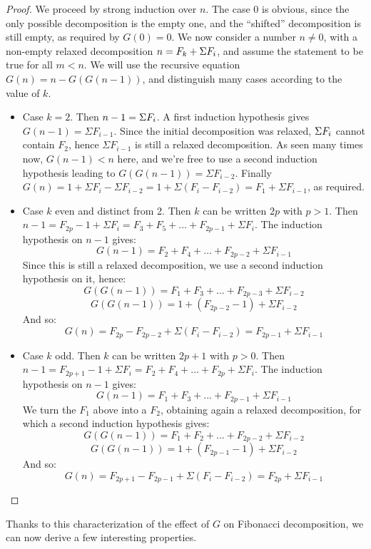 \documentclass[a4paper,11pt]{article}
\begin{document}
\begin{proof}
We proceed by strong induction over $n$. The case $0$ is obvious,
since the only possible decomposition is the empty one, and the
``shifted'' decomposition is still empty, as required by $G(0)=0$.
We now consider a number $n\neq 0$, with a non-empty relaxed decomposition
$n = F_k+\Sigma F_i$, and assume the statement to be true for all $m<n$.
We will use the recursive equation $G(n)=n-G(G(n-1))$, and distinguish
many cases according to the value of $k$.
\begin{itemize}
\item Case $k=2$. Then $n-1 = \Sigma F_i$. A first induction
  hypothesis gives $G(n-1) = \Sigma F_{i-1}$. Since the initial
  decomposition was relaxed, $\Sigma F_i$ cannot contain $F_2$,
  hence $\Sigma F_{i-1}$ is still a relaxed decomposition. As seen
  many times now, $G(n-1)<n$ here, and we're free to use a second
  induction hypothesis leading to $G(G(n-1)) = \Sigma F_{i-2}$.
  Finally $G(n) = 1+\Sigma F_i - \Sigma F_{i-2} = 1 + \Sigma (F_i-F_{i-2})
   = F_1 + \Sigma F_{i-1}$, as required.

\item Case $k$ even and distinct from 2. Then $k$ can be written $2p$ with $p>1$.
  Then $n-1 = F_{2p}-1 + \Sigma F_i = F_3+F_5+...+F_{2p-1}+\Sigma F_i$.
  The induction hypothesis on $n-1$ gives:
  $$G(n-1) = F_2+F_4+...+F_{2p-2}+\Sigma F_{i-1}$$
  Since this is still a relaxed decomposition, we use a second
  induction hypothesis on it, hence:
  $$G(G(n-1)) = F_1+F_3+...+F_{2p-3}+\Sigma F_{i-2}$$
  $$G(G(n-1)) = 1 + (F_{2p-2}-1)+\Sigma F_{i-2}$$
  And so:
  $$G(n) = F_{2p}-F_{2p-2} + \Sigma (F_i - F_{i-2}) =
           F_{2p-1} + \Sigma F_{i-1}$$

\item Case $k$ odd. Then $k$ can be written $2p+1$ with $p>0$.
  Then $n-1 = F_{2p+1}-1 + \Sigma F_i = F_2+F_4+...+F_{2p}+\Sigma F_i$.
  The induction hypothesis on $n-1$ gives:
  $$G(n-1) = F_1+F_3+...+F_{2p-1}+\Sigma F_{i-1}$$
  We turn the $F_1$ above into a $F_2$, obtaining again a relaxed
  decomposition, for which a second induction hypothesis gives:
  $$G(G(n-1)) = F_1+F_2+...+F_{2p-2}+\Sigma F_{i-2}$$
  $$G(G(n-1)) = 1 + (F_{2p-1}-1)+\Sigma F_{i-2}$$
  And so:
  $$G(n) = F_{2p+1}-F_{2p-1} + \Sigma (F_i - F_{i-2}) =
           F_{2p} + \Sigma F_{i-1}$$
\end{itemize}
\end{proof}

Thanks to this characterization of the effect of $G$ on Fibonacci
decomposition, we can now derive a few interesting properties.
\end{document}
